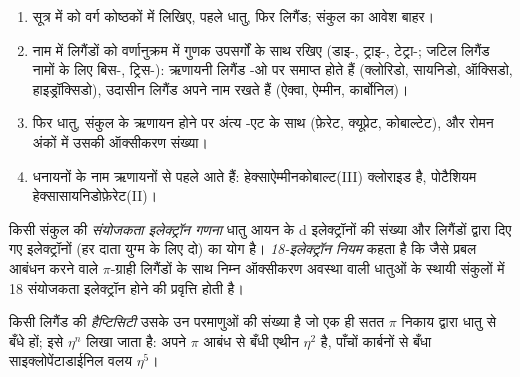 \begin{method}[संकुल का नामकरण]\label{met:b2:coordination-complexes:naming}
\begin{enumerate}
  \item सूत्र में  को वर्ग कोष्ठकों में लिखिए, पहले धातु,
        फिर लिगैंड; संकुल का आवेश बाहर।
  \item नाम में लिगैंडों को वर्णानुक्रम में गुणक उपसर्गों के साथ रखिए
        (डाइ-, ट्राइ-, टेट्रा-; जटिल लिगैंड नामों के लिए बिस-, ट्रिस-): ऋणायनी
        लिगैंड -ओ पर समाप्त होते हैं (क्लोरिडो, सायनिडो, ऑक्सिडो, हाइड्रॉक्सिडो), उदासीन लिगैंड
        अपने नाम रखते हैं (ऐक्वा, ऐम्मीन, कार्बोनिल)।
  \item फिर धातु, संकुल के ऋणायन होने पर अंत्य -एट के साथ (फ़ेरेट,
        क्यूप्रेट, कोबाल्टेट), और रोमन अंकों में उसकी ऑक्सीकरण संख्या।
  \item धनायनों के नाम ऋणायनों से पहले आते हैं: 
        हेक्साऐम्मीनकोबाल्ट(III) क्लोराइड है,  पोटैशियम
        हेक्सासायनिडोफ़ेरेट(II)।
\end{enumerate}
\end{method}

\begin{definition}[इलेक्ट्रॉन गणना]\label{def:b2:coordination-complexes:electron-count}
किसी संकुल की \emph{संयोजकता इलेक्ट्रॉन गणना}
धातु आयन के d इलेक्ट्रॉनों की संख्या और लिगैंडों द्वारा दिए गए इलेक्ट्रॉनों (हर दाता युग्म के
लिए दो) का योग है। \emph{18-इलेक्ट्रॉन नियम} कहता है कि
 जैसे प्रबल आबंधन करने वाले $\pi$-ग्राही लिगैंडों के साथ निम्न ऑक्सीकरण अवस्था
वाली धातुओं के स्थायी संकुलों में 18 संयोजकता इलेक्ट्रॉन होने की प्रवृत्ति होती है।
\end{definition}

\begin{definition}[हैप्टिसिटी]\label{def:b2:coordination-complexes:hapticity}
किसी लिगैंड की \emph{हैप्टिसिटी} उसके उन परमाणुओं की संख्या है जो
एक ही सतत $\pi$ निकाय द्वारा धातु से बँधे हों; इसे $\eta^n$ लिखा जाता है: अपने
$\pi$ आबंध से बँधी एथीन $\eta^2$ है, पाँचों कार्बनों से बँधा साइक्लोपेंटाडाईनिल वलय $\eta^5$।
\end{definition}

